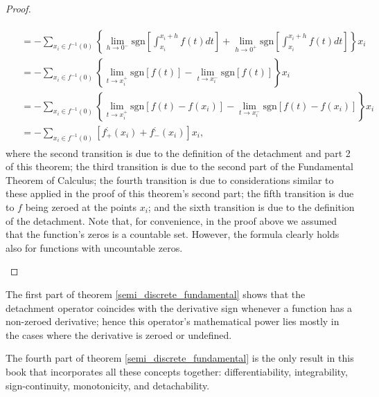 \documentclass[11pt]{book}
\begin{document}
\begin{proof}
\begin{enumerate}
\begin{align}
\begin{aligned}
&= -\underset{x_{i}\in f^{-1}\left(0\right)}{\sum}\left\{ \underset{h\rightarrow0^{-}}{\lim}\text{sgn}\left[\int_{x_{i}}^{x_{i}+h}f\left(t\right)dt\right]+\underset{h\rightarrow0^{+}}{\lim}\text{sgn}\left[\int_{x_{i}}^{x_{i}+h}f\left(t\right)dt\right]\right\} x_{i}\\
&=-\underset{x_{i}\in f^{-1}\left(0\right)}{\sum}\left\{ \underset{t\rightarrow x_{i}^{+}}{\lim}\text{sgn}\left[f\left(t\right)\right]-\underset{t\rightarrow x_{i}^{-}}{\lim}\text{sgn}\left[f\left(t\right)\right]\right\} x_{i}\\
&=-\underset{x_{i}\in f^{-1}\left(0\right)}{\sum}\left\{ \underset{t\rightarrow x_{i}^{+}}{\lim}\text{sgn}\left[f\left(t\right)-f\left(x_{i}\right)\right]-\underset{t\rightarrow x_{i}^{-}}{\lim}\text{sgn}\left[f\left(t\right)-f\left(x_{i}\right)\right]\right\} x_{i}\\
&=-\underset{x_{i}\in f^{-1}\left(0\right)}{\sum}\left[f_{+}^{;}\left(x_{i}\right)+f_{-}^{;}\left(x_{i}\right)\right]x_{i},
\end{aligned}
\end{align}
where the second transition is due to the definition of the detachment and part 2 of this theorem; the third transition is due to the second part of the Fundamental Theorem of Calculus; the fourth transition is due to considerations similar to these applied in the proof of this theorem's second part; the fifth transition is due to $f$ being zeroed at the points $x_{i}$; and the sixth transition is due to the definition of the detachment. Note that, for convenience, in the proof above we assumed that the function's zeros is a countable set. However, the formula clearly holds also for functions with uncountable zeros.
\end{enumerate}
\end{proof}
\begin{remark}The first part of theorem \ref{semi_discrete_fundamental} shows that the detachment operator coincides with the derivative sign whenever a function has a non-zeroed derivative; hence this operator's mathematical power lies mostly in the cases where the derivative is zeroed or undefined.
\end{remark}
\begin{remark}The fourth part of theorem \ref{semi_discrete_fundamental} is the only result in this book that incorporates all these concepts together: differentiability, integrability, sign-continuity, monotonicity, and detachability.
\end{remark}
\end{document}

